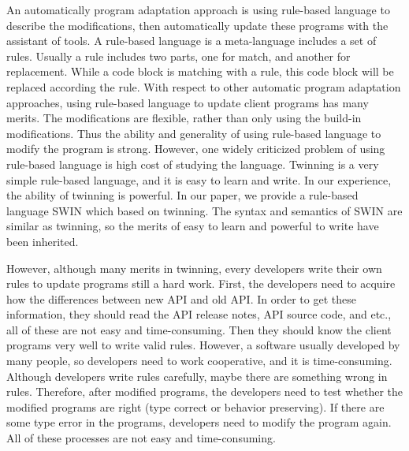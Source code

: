 An automatically program adaptation approach is using rule-based language to describe
the modifications, 
then automatically update these programs with the assistant of tools.
A rule-based language is a meta-language includes a set of
rules. Usually a rule includes two parts, one for match, and another for replacement.
While a code block is matching with a rule, this code block will be replaced according
the rule. 
With respect to other automatic program adaptation approaches, 
using rule-based language to update client programs has many merits.
The modifications are flexible, rather than only using the build-in 
modifications. Thus the ability and generality of using rule-based 
language to modify the program is strong. However, one widely criticized 
problem of using rule-based language is high cost of studying the language.
Twinning \cite{twinning} is a very simple rule-based language, and it is easy to learn and write.
In our experience,  the ability of twinning is powerful. 
In our paper, we provide a rule-based language SWIN which based on twinning.
The syntax and semantics of SWIN are similar as twinning, so the merits of easy
to learn and powerful to write have been inherited. 

However, although many merits in twinning, every developers
write their own rules to update programs still a hard work. First,
the developers need to acquire how the differences between new API and old API.
In order to get these information, they should read the API release notes, 
API source code, and etc., all of these
are not easy and time-consuming. Then they should know the client programs very well to write
valid rules. However, a software usually developed by many people, so developers
need to work cooperative, and it is time-consuming. Although developers write rules carefully, 
maybe there are something wrong in rules.
Therefore, after modified programs, 
the developers need to test whether the modified programs are right (type correct or behavior preserving). 
If there
are some type error in the programs, developers need to modify the program again.
All of these processes are not easy and time-consuming.

